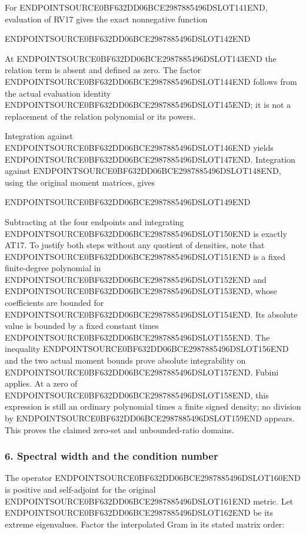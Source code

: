 For ENDPOINTSOURCE0BF632DD06BCE2987885496DSLOT141END, evaluation of RV17 gives the exact nonnegative function

ENDPOINTSOURCE0BF632DD06BCE2987885496DSLOT142END

At ENDPOINTSOURCE0BF632DD06BCE2987885496DSLOT143END the relation term is absent and defined as zero. The factor ENDPOINTSOURCE0BF632DD06BCE2987885496DSLOT144END follows from the actual evaluation identity ENDPOINTSOURCE0BF632DD06BCE2987885496DSLOT145END; it is not a replacement of the relation polynomial or its powers.

Integration against ENDPOINTSOURCE0BF632DD06BCE2987885496DSLOT146END yields ENDPOINTSOURCE0BF632DD06BCE2987885496DSLOT147END. Integration against ENDPOINTSOURCE0BF632DD06BCE2987885496DSLOT148END, using the original moment matrices, gives

ENDPOINTSOURCE0BF632DD06BCE2987885496DSLOT149END

Subtracting at the four endpoints and integrating ENDPOINTSOURCE0BF632DD06BCE2987885496DSLOT150END is exactly AT17. To justify both steps without any quotient of densities, note that ENDPOINTSOURCE0BF632DD06BCE2987885496DSLOT151END is a fixed finite-degree polynomial in ENDPOINTSOURCE0BF632DD06BCE2987885496DSLOT152END and ENDPOINTSOURCE0BF632DD06BCE2987885496DSLOT153END, whose coefficients are bounded for ENDPOINTSOURCE0BF632DD06BCE2987885496DSLOT154END. Its absolute value is bounded by a fixed constant times ENDPOINTSOURCE0BF632DD06BCE2987885496DSLOT155END. The inequality ENDPOINTSOURCE0BF632DD06BCE2987885496DSLOT156END and the two actual moment bounds prove absolute integrability on ENDPOINTSOURCE0BF632DD06BCE2987885496DSLOT157END. Fubini applies. At a zero of ENDPOINTSOURCE0BF632DD06BCE2987885496DSLOT158END, this expression is still an ordinary polynomial times a finite signed density; no division by ENDPOINTSOURCE0BF632DD06BCE2987885496DSLOT159END appears. This proves the claimed zero-set and unbounded-ratio domains.

\subsubsection{6. Spectral width and the condition number}\label{endpoint-determinant_review--spectral-width-and-the-condition-number}

The operator ENDPOINTSOURCE0BF632DD06BCE2987885496DSLOT160END is positive and self-adjoint for the original ENDPOINTSOURCE0BF632DD06BCE2987885496DSLOT161END metric. Let ENDPOINTSOURCE0BF632DD06BCE2987885496DSLOT162END be its extreme eigenvalues. Factor the interpolated Gram in its stated matrix order:

